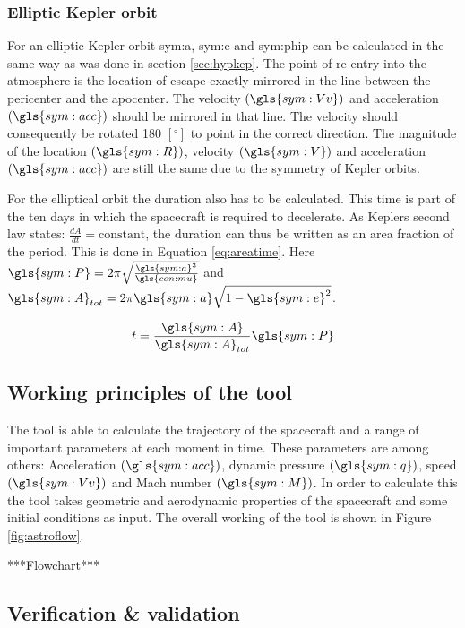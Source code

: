 \subsubsection{Elliptic Kepler orbit}
 \label{sec:eliptickep}
For an elliptic Kepler orbit \gls{sym:a}, \gls{sym:e} and \gls{sym:phip} can be calculated in the same way as was done in section \ref{sec:hypkep}. The point of re-entry into the atmosphere is the location of escape exactly mirrored in the line between the pericenter and the apocenter. The velocity $\left(\gls{sym:Vv}\right)$ and  acceleration $\left(\gls{sym:acc}\right)$  should be mirrored in that line. The velocity should consequently be rotated 180 $\left[^\circ\right]$ to point in the correct direction. The magnitude of the location $\left(\gls{sym:R}\right)$, velocity $\left(\gls{sym:V}\right)$ and acceleration $\left(\gls{sym:acc}\right)$ are still the same due to the symmetry of Kepler orbits.

For the elliptical orbit the duration also has to be calculated. This time is part of the ten days in which the spacecraft is required to decelerate. As Keplers second law states: $\frac{dA}{dt}=\mbox{constant}$, the duration can thus be written as an area fraction of the period. This is done in Equation \ref{eq:areatime}. Here $\gls{sym:P} = 2\pi\sqrt{\frac{\gls{sym:a}^3}{\gls{con:mu}}}$ and $\gls{sym:A}_{tot} = 2\pi \gls{sym:a} \sqrt{1-\gls{sym:e}^2}$.

\begin{equation}
t = \frac{\gls{sym:A}}{\gls{sym:A}_{tot}}\gls{sym:P}
\label{eq:areatime}
\end{equation}

\subsection{Working principles of the tool}
\label{sec:astrowp}
The tool is able to calculate the trajectory of the spacecraft and a range of important parameters at each moment in time. These parameters are among others: Acceleration $\left(\gls{sym:acc}\right)$, dynamic pressure $\left(\gls{sym:q}\right)$, speed $\left(\gls{sym:Vv}\right)$ and Mach number $\left(\gls{sym:M}\right)$. In order to calculate this the tool takes geometric and aerodynamic properties of the spacecraft and some initial conditions as input. The overall working of the tool is shown in Figure \ref{fig:astroflow}.

***Flowchart***\\

\subsection{Verification \& validation}
\label{sec:astrovv}

